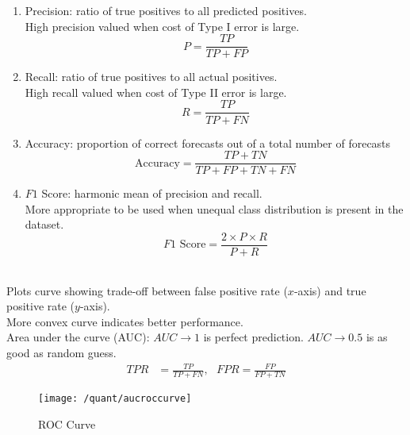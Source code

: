 \begin{definition} 
\begin{enumerate}[label=\roman*.]
\setlength{\itemsep}{0pt}
\item Precision: ratio of true positives to all predicted positives.\\
High precision valued when cost of Type I error is large.
\begin{equation}
P = \frac{TP}{TP + FP} \nonumber
\end{equation}
\item Recall: ratio of true positives to all actual positives.\\
High recall valued when cost of Type II error is large.
\begin{equation}
R = \frac{TP}{TP + FN} \nonumber
\end{equation}
\item Accuracy: proportion of correct forecasts out of a total number of forecasts
\begin{equation}
\text{Accuracy} = \frac{TP + TN}{TP + FP + TN + FN} \nonumber
\end{equation}
\item $F1$ Score: harmonic mean of precision and recall.\\
More appropriate to be used when unequal class distribution is present in the dataset.
\begin{equation}
F1 \text{ Score} = \frac{2 \times P \times R}{P + R} \nonumber
\end{equation}
\end{enumerate}
\end{definition}

\begin{definition} \\
Plots curve showing trade-off between false positive rate ($x$-axis) and true positive rate ($y$-axis).\\
More convex curve indicates better performance.\\
Area under the curve (AUC): $AUC \rightarrow 1$ is perfect prediction. $AUC \rightarrow 0.5$ is as good as random guess.
\begin{align}
TPR &= \frac{TP}{TP + FN}, \ \ \ FPR = \frac{FP}{FP + TN} \nonumber
\end{align} 
\end{definition}

\begin{figure}[H]
\centering
\texttt{[image: /quant/aucroccurve]}
\caption{ROC Curve}
\end{figure}

